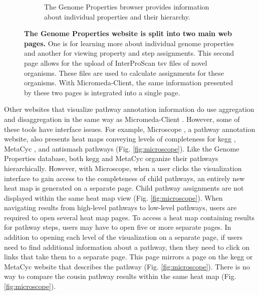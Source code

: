 \begin{figure}[!ht]
\begin{subfigure}[b]{0.46\textwidth}
         \caption{The Genome Properties browser provides information about 
individual properties and their hierarchy.}
         \label{fig:property-browser}
     \end{subfigure}
     \caption[The Genome Properties website is split into two main web 
pages.]{\textbf{The Genome Properties website is split into two main web pages.} 
One is for learning more about individual genome properties and another for 
viewing property and step assignments. This second page allows for the upload of 
InterProScan \gls{tsv} files of novel organisms. These files are used to 
calculate assignments for these organisms. With Micromeda-Client, the same 
information presented by these two pages is integrated into a single page.}
     \label{fig:genome-properties-interface}
\end{figure}

Other websites that visualize pathway annotation information do use aggregation 
and disaggregation in the same way as Micromeda-Client 
\cite{vallenet2016microscope,darzi2019functree2}. However, some of these tools 
have interface issues. For example, Microscope \cite{vallenet2016microscope}, a 
pathway annotation website, also presents heat maps conveying levels of 
completeness for \gls{kegg} \cite{kanehisa2000kegg}, MetaCyc 
\cite{karp2002metacyc}, and \gls{antismash} \cite{blin2019antismash} pathways 
(Fig. \ref{fig:microscope}). Like the Genome Properties database, both 
\gls{kegg} and MetaCyc organize their pathways hierarchically. However, with 
Microscope, when a user clicks the visualization interface to gain access to the 
completeness of child pathways, an entirely new heat map is generated on a 
separate page. Child pathway assignments are not displayed within the same 
heat map view (Fig. \ref{fig:microscope}). When navigating results from 
high-level pathways to low-level pathways, users are required to open several 
heat map pages. To access a heat map containing results for pathway steps, 
users may have to open five or more separate pages. In addition to opening each 
level of the visualization on a separate page, if users need to find additional 
information about a pathway, then they need to click on links that take them to 
a separate page. This page mirrors a page on the \gls{kegg} or MetaCyc website 
that describes the pathway (Fig. \ref{fig:microscope}). There is no way to 
compare the cousin pathway results within the same heat map 
(Fig. \ref{fig:microscope}).

